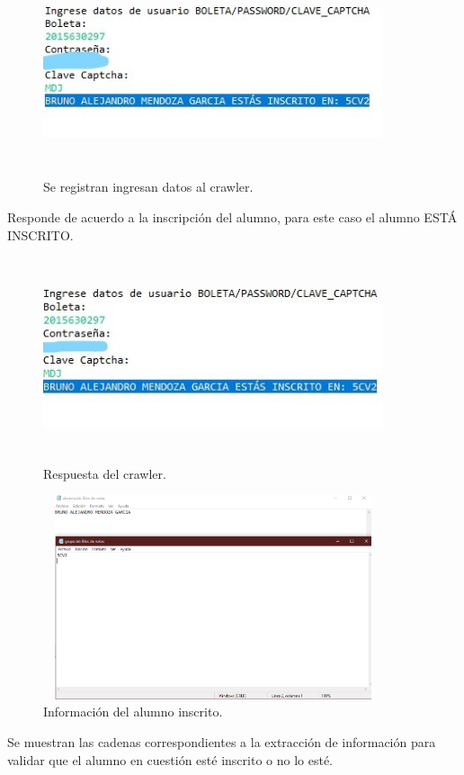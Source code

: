 	\begin{figure}[hbt!]
		\centering
		\includegraphics[width=10cm, height=6cm]{Imagenes/Crawler/Datoslogininscrito}
		\caption{Se registran ingresan datos al crawler.}
		\label{datoslogininscrito}
	\end{figure}
	
	\noindent Responde de acuerdo a la inscripción del alumno, para este caso el alumno ESTÁ INSCRITO.
	
	\begin{figure}[hbt!]
		\centering
		\includegraphics[width=10cm, height=6cm]{Imagenes/Crawler/Logininscrito}
		\caption{Respuesta del crawler.}
		\label{logininscrito}
	\end{figure}
	
	\begin{figure} [hbt!]
		\centering
		\includegraphics[width=10cm, height=6cm]{Imagenes/Crawler/Infologininscrito}
		\caption{Información del alumno inscrito.}
		\label{infologininscrito}
	\end{figure}
	\noindent Se muestran las cadenas correspondientes a la extracción de información para validar que el alumno en cuestión esté inscrito o no lo esté.

